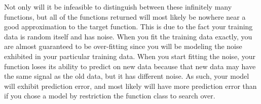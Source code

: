 \documentclass[11pt]{article}
\begin{document}
\vspace{5 mm}
\noindent
Not only will it be infeasible to distinguish between these infinitely many
functions, but all of the functions returned will most likely be nowhere near a
good approximation to the target function. This is due to the fact your training
data is random itself and has noise. When you fit the training data exactly, you
are almost guaranteed to be over-fitting since you will be modeling the noise
exhibited in your particular training data. When you start fitting the noise,
your function loses its ability to predict on new data because that new data may
have the same signal as the old data, but it has different noise. As such, your 
model will exhibit prediction error, and most likely will have more prediction 
error than if you chose a model by restriction the function class to search 
over.
\end{document}
